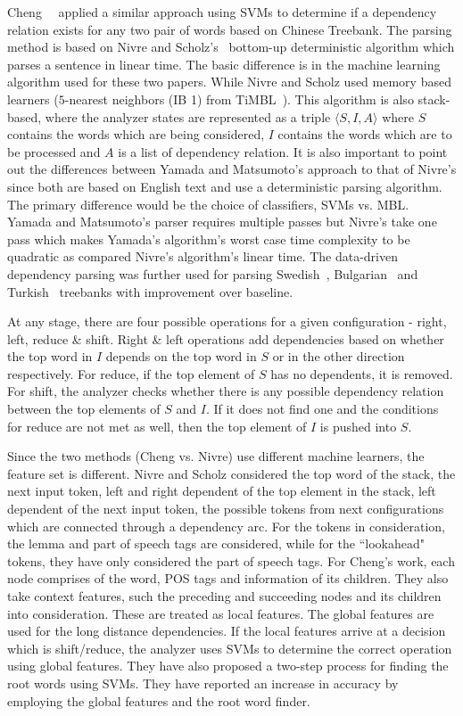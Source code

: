 Cheng~\etal~\cite{cheng2005chinese} applied a similar approach using SVMs to determine if a dependency relation exists for any two pair of words based on  Chinese Treebank. The parsing method is based on Nivre and Scholz's~\cite{Nivre:2004:DDP:1220355.1220365} bottom-up deterministic algorithm which parses a sentence in linear time. The basic difference is in the machine learning algorithm used for these two papers. While Nivre and Scholz used memory based learners ($5$-nearest neighbors (IB 1) from TiMBL~\cite{daelemans2004timbl}). This algorithm is also stack-based, where the analyzer states are represented as a triple $\langle S, I, A \rangle$ where $S$ contains the words which are being considered, $I$ contains the words which are to be processed and $A$ is a list of dependency relation. 
It is also important to point out the differences between Yamada and Matsumoto's approach to that of Nivre's since both are based on English text and use a deterministic parsing algorithm. The primary difference would be the choice of classifiers, SVMs vs. MBL. Yamada and Matsumoto's parser requires multiple passes but Nivre's take one pass which makes Yamada's algorithm's worst case time complexity to be quadratic as compared Nivre's algorithm's linear time.
The data-driven dependency parsing was further used for parsing Swedish~\cite{nivrej.2004}, Bulgarian~\cite{marinov2005data} and Turkish~\cite{eryiugit2008dependency} treebanks with improvement over baseline.

At any stage, there are four possible operations for a given configuration - right, left, reduce \& shift. Right \& left operations add dependencies based on whether the top word in $I$ depends on the top word in $S$ or in the other direction respectively. For reduce, if the top element of $S$ has no dependents, it is removed. For shift, the analyzer checks whether there is any possible dependency relation between the top elements of $S$ and $I$. If it does not find one and the conditions for reduce are not met as well, then the top element of $I$ is pushed into $S$.

Since the two methods (Cheng vs. Nivre) use different machine learners, the feature set is different. Nivre and Scholz considered the top word of the stack, the next input token, left and right dependent of the top element in the stack, left dependent of the next input token, the possible tokens from next configurations which are connected through a dependency arc. For the tokens in consideration, the lemma and part of speech tags are considered, while for the ``lookahead" tokens, they have only considered the part of speech tags. For Cheng's work, each node comprises of the word, POS tags and information of its children. They also take context features, such the preceding and succeeding nodes and its children into consideration. These are treated as local features. The global features are used for the long distance dependencies. If the local features arrive at a decision which is shift/reduce, the analyzer uses SVMs to determine the correct operation using global features. They have also proposed a two-step process for finding the root words using SVMs. They have reported an increase in accuracy by employing the global features and the root word finder. 

